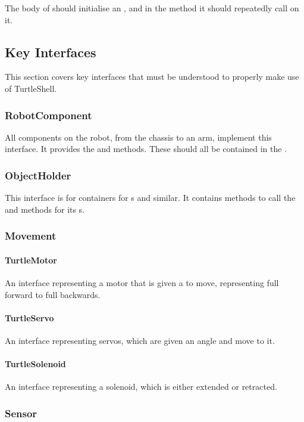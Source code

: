 \documentclass[]{report}
\begin{document}
The body of  should initialise an , and in the  method it should repeatedly call  on it.

\subsection{Key Interfaces}
This section covers key interfaces that must be understood to properly make use of TurtleShell.

\subsubsection{RobotComponent}
All components on the robot, from the chassis to an arm, implement this interface.
It provides the  and  methods.
These should all be contained in the .

\subsubsection{ObjectHolder}
This interface is for containers for s and similar.
It contains methods to call the  and  methods for its s.

\subsubsection{Movement}
\paragraph{TurtleMotor}
An interface representing a motor that is given a  to move, representing full forward to full backwards.
\paragraph{TurtleServo}
An interface representing servos, which are given an angle and move to it.
\paragraph{TurtleSolenoid}
An interface representing a solenoid, which is either extended or retracted.

\subsubsection{Sensor}
\end{document}
